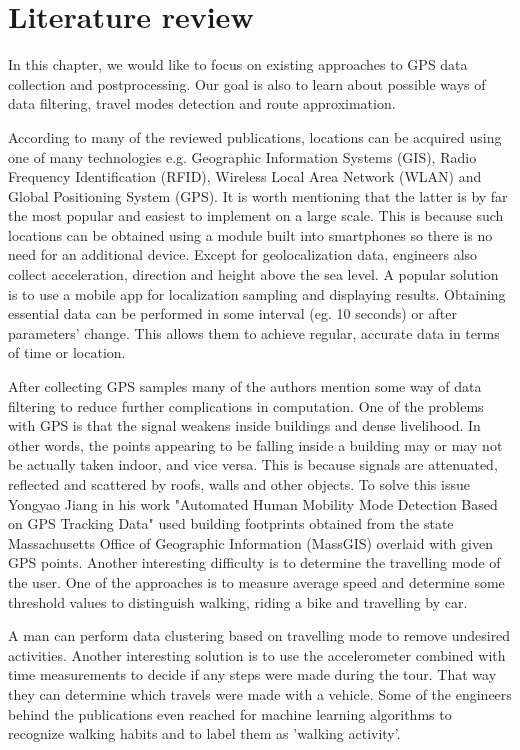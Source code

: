 \chapter{Literature review}

\blindtext[2]

In this chapter, we would like to focus on existing approaches to GPS data collection and postprocessing. Our goal is also to learn about possible ways of data filtering, travel modes detection and route approximation.

According to many of the reviewed publications, locations can be acquired using one of many technologies e.g. Geographic Information Systems (GIS), Radio Frequency Identification (RFID), Wireless Local Area Network (WLAN) and Global Positioning System (GPS). It is worth mentioning that the latter is by far the most popular and easiest to implement on a large scale. This is because such locations can be obtained using a module built into smartphones so there is no need for an additional device. Except for geolocalization data, engineers also collect acceleration, direction and height above the sea level. A popular solution is to use a mobile app for localization sampling and displaying results. Obtaining essential data can be performed in some interval (eg. 10 seconds) or after parameters' change. This allows them to achieve regular, accurate data in terms of time or location.

After collecting GPS samples many of the authors mention some way of data filtering to reduce further complications in computation. One of the problems with GPS is that the signal weakens inside buildings and dense livelihood. In other words, the points appearing to be falling inside a building may or may not be actually taken indoor, and vice versa. This is because signals are attenuated, reflected and scattered by roofs, walls and other objects. To solve this issue Yongyao Jiang in his work "Automated Human Mobility Mode Detection Based on GPS Tracking Data" used building footprints obtained from the state Massachusetts Office of Geographic Information (MassGIS) overlaid with given GPS points.  Another interesting difficulty is to determine the travelling mode of the user. One of the approaches is to measure average speed and determine some threshold values to distinguish walking, riding a bike and travelling by car.

A man can perform data clustering based on travelling mode to remove undesired activities.  Another interesting solution is to use the accelerometer combined with time measurements to decide if any steps were made during the tour. That way they can determine which travels were made with a vehicle. Some of the engineers behind the publications even reached for machine learning algorithms to recognize walking habits and to label them as 'walking activity'.

